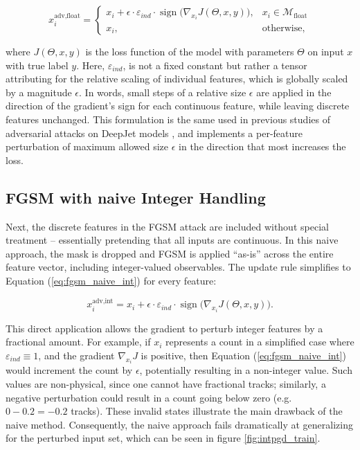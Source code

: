 \begin{equation}
x_i^{\text{adv,float}} = 
    \begin{cases}
        x_i + \epsilon \cdot \varepsilon_{ind} \cdot \operatorname{sign}\!\bigl(\nabla_{x_i} J(\Theta, x, y)\bigr), & x_i\in\mathcal{M}_{\text{float}} \\[6pt]
        x_i, & \text{otherwise},
    \end{cases}
\label{eq:fgsm}
\end{equation}

where $J(\Theta, x, y)$ is the loss function of the model with parameters $\Theta$ on input $x$ with true label $y$. 
Here, $\varepsilon_{ind}$, is not a fixed constant but rather a tensor attributing for the relative scaling of individual features, which is globally scaled by a magnitude $\epsilon$.  
In words, small steps of a relative size $\epsilon$ are applied in the direction of the gradient's sign for each continuous feature, while leaving discrete features unchanged. This formulation is the same used in previous studies of adversarial attacks on DeepJet models \cite{CMS-DP-2024-020}, and implements a per-feature perturbation of maximum allowed size $\epsilon$ in the direction that most increases the loss.

\subsection{FGSM with naive Integer Handling}

Next, the discrete features in the FGSM attack are included without special treatment – essentially pretending that all inputs are continuous. In this naive approach, the mask is dropped and FGSM is applied “as-is” across the entire feature vector, including integer-valued observables. The update rule simplifies to Equation (\ref{eq:fgsm_naive_int}) for every feature:

\begin{equation}
x_i^{\text{adv,int}} = x_i + \epsilon \cdot \varepsilon_{ind} \cdot \operatorname{sign}\!\bigl(\nabla_{x_i} J(\Theta, x, y)\bigr).
\label{eq:fgsm_naive_int}
\end{equation}

This direct application allows the gradient to perturb integer features by a fractional amount. For example, if $x_i$ represents a count in a simplified case where $\varepsilon_{ind}\equiv1$, and the gradient $\nabla_{x_i} J$ is positive, then Equation (\ref{eq:fgsm_naive_int}) would increment the count by $\epsilon$, potentially resulting in a non-integer value. Such values are non-physical, since one cannot have fractional tracks; similarly, a negative perturbation could result in a count going below zero (e.g. $0-0.2=-0.2$ tracks). These invalid states illustrate the main drawback of the naive method. Consequently, the naive approach fails dramatically at generalizing for the perturbed input set, which can be seen in figure \ref{fig:intpgd_train}. 



